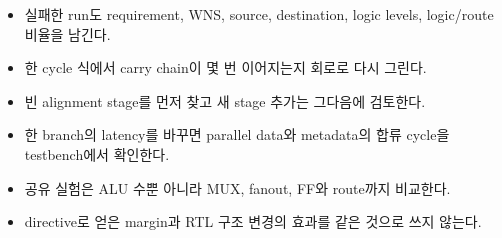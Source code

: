 \begin{checklistbox}
\begin{itemize}
  \item 실패한 run도 requirement, WNS, source, destination, logic levels,
        logic/route 비율을 남긴다.
  \item 한 cycle 식에서 carry chain이 몇 번 이어지는지 회로로 다시 그린다.
  \item 빈 alignment stage를 먼저 찾고 새 stage 추가는 그다음에 검토한다.
  \item 한 branch의 latency를 바꾸면 parallel data와 metadata의 합류 cycle을
        testbench에서 확인한다.
  \item 공유 실험은 ALU 수뿐 아니라 MUX, fanout, FF와 route까지 비교한다.
  \item directive로 얻은 margin과 RTL 구조 변경의 효과를 같은 것으로 쓰지 않는다.
\end{itemize}
\end{checklistbox}

